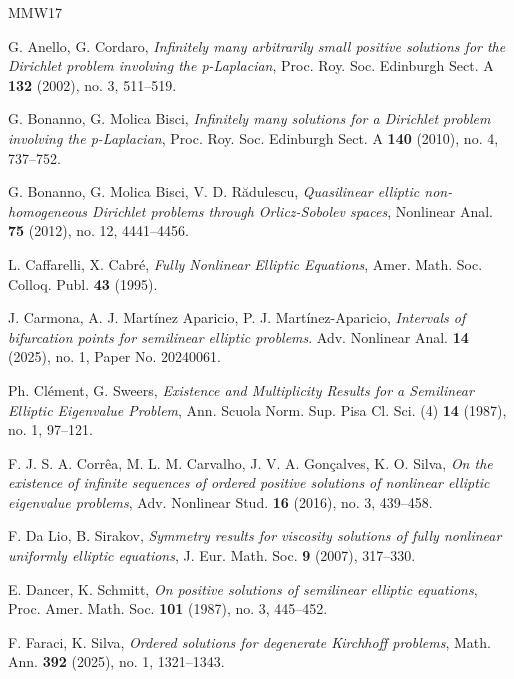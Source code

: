 \documentclass[10pt,twoside,english,reqno,a4paper]{amsart}
\theoremstyle{plain}
\theoremstyle{plain}
\theoremstyle{definition}
\theoremstyle{remark}
\numberwithin{equation}{section}
\begin{document}
\begin{thebibliography}{MMW17}

     G. Anello, G. Cordaro, \textit{Infinitely many arbitrarily small positive solutions for the Dirichlet problem involving the p-Laplacian}, Proc. Roy. Soc. Edinburgh Sect. A \textbf{132} (2002), no. 3, 511--519.

     G. Bonanno, G. Molica Bisci, \textit{Infinitely many solutions for a Dirichlet problem involving the p-Laplacian}, Proc. Roy. Soc. Edinburgh Sect. A \textbf{140} (2010), no. 4, 737--752.

     G. Bonanno, G. Molica Bisci, V. D. R\u adulescu, \textit{Quasilinear elliptic non-homogeneous Dirichlet problems through Orlicz-Sobolev spaces}, Nonlinear Anal. \textbf{75} (2012), no. 12, 4441--4456.

     L. Caffarelli, X. Cabré, \textit{Fully Nonlinear Elliptic Equations}, Amer. Math. Soc. Colloq. Publ. \textbf{43} (1995).

     J. Carmona, A. J. Mart\'inez Aparicio, P. J. Mart\'inez-Aparicio, \textit{Intervals of bifurcation points for semilinear elliptic problems}. Adv. Nonlinear Anal. \textbf{14} (2025), no. 1, Paper No. 20240061.

     Ph. Cl\'ement, G. Sweers, \textit{Existence and Multiplicity Results for a Semilinear Elliptic Eigenvalue Problem}, Ann. Scuola Norm. Sup. Pisa Cl. Sci. (4) \textbf{14} (1987),  no. 1, 97--121.

     F. J. S. A. Corr\^ea, M. L. M. Carvalho, J. V. A. Gon\c{c}alves, K. O. Silva, \textit{On the existence of infinite sequences of ordered positive solutions of nonlinear elliptic eigenvalue problems}, Adv. Nonlinear Stud. {\bf 16} (2016), no. 3, 439--458.

     F. Da Lio, B. Sirakov, \textit{Symmetry results for viscosity solutions of fully nonlinear uniformly elliptic equations}, J. Eur. Math. Soc. \textbf{9} (2007), 317--330.

     E. Dancer, K. Schmitt, \textit{On positive solutions of semilinear elliptic equations}, Proc. Amer. Math. Soc. \textbf{101} (1987), no. 3, 445--452. 

     F. Faraci, K. Silva, \textit{Ordered solutions for degenerate Kirchhoff problems}, Math. Ann. \textbf{392} (2025), no. 1, 1321--1343.
    

\end{thebibliography}
\end{document}
